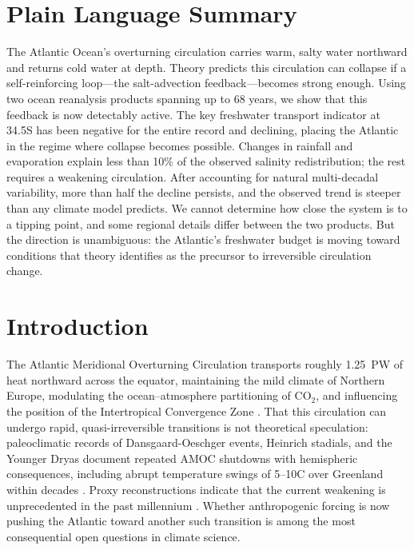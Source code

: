 \documentclass{agujournal2019}
\begin{document}
\section*{Plain Language Summary}
The Atlantic Ocean's overturning circulation carries warm, salty water northward and returns cold water at depth. Theory predicts this circulation can collapse if a self-reinforcing loop---the salt-advection feedback---becomes strong enough. Using two ocean reanalysis products spanning up to 68 years, we show that this feedback is now detectably active. The key freshwater transport indicator at 34.5\textdegree S has been negative for the entire record and declining, placing the Atlantic in the regime where collapse becomes possible. Changes in rainfall and evaporation explain less than 10\% of the observed salinity redistribution; the rest requires a weakening circulation. After accounting for natural multi-decadal variability, more than half the decline persists, and the observed trend is steeper than any climate model predicts. We cannot determine how close the system is to a tipping point, and some regional details differ between the two products. But the direction is unambiguous: the Atlantic's freshwater budget is moving toward conditions that theory identifies as the precursor to irreversible circulation change.

\section{Introduction}

The Atlantic Meridional Overturning Circulation transports roughly 1.25~PW of heat northward across the equator, maintaining the mild climate of Northern Europe, modulating the ocean--atmosphere partitioning of CO$_2$, and influencing the position of the Intertropical Convergence Zone \cite{Buckley2016,Ganachaud2000}. That this circulation can undergo rapid, quasi-irreversible transitions is not theoretical speculation: paleoclimatic records of Dansgaard-Oeschger events, Heinrich stadials, and the Younger Dryas document repeated AMOC shutdowns with hemispheric consequences, including abrupt temperature swings of 5--10\textdegree C over Greenland within decades \cite{Rahmstorf2002}. Proxy reconstructions indicate that the current weakening is unprecedented in the past millennium \cite{Caesar2021}. Whether anthropogenic forcing is now pushing the Atlantic toward another such transition is among the most consequential open questions in climate science.
\end{document}
